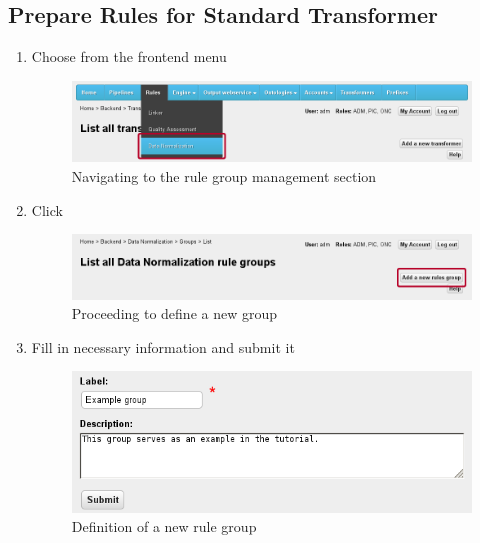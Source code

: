 \subsection*{Prepare Rules for Standard Transformer}
\begin{enumerate}[resume]

\vspace*{0.2\textheight}

	\item Choose  from the frontend menu

\begin{figure}[!ht]
    \centering
    \includegraphics[width=\textwidth]{images/fe-walkthrough-menu-rules.png}
    \caption{Navigating to the rule group management section}
	\label{fig:feWTMenuRules}
\end{figure}
\FloatBarrier

\vspace*{0.2\textheight}

	\item Click 

\begin{figure}[!ht]
    \centering
    \includegraphics[width=\textwidth]{images/fe-walkthrough-add-group.png}
    \caption{Proceeding to define a new group}
	\label{fig:feWTAddGroup}
\end{figure}
\FloatBarrier

\newpage

\vspace*{0.1\textheight}

	\item Fill in necessary information and submit it

\begin{figure}[!ht]
    \centering
    \includegraphics[width=\textwidth]{images/fe-walkthrough-new-group.png}
    \caption{Definition of a new rule group}
	\label{fig:feWTNewGroup}
\end{figure}
\FloatBarrier


\end{enumerate}
